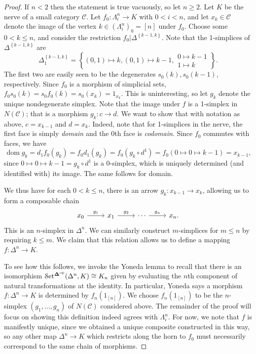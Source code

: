 \begin{proof}
	If $n<2$ then the statement is true vacuously, so let $n\geq 2$. Let $K$ be the nerve of a small category $\mathcal{C} $. Let $f_0 : \Lambda_i^n \to K$ with $0<i<n$, and let $x_k\in\mathcal{C} $ denote the image of the vertex $k\in\left( \Lambda_i^n \right) _0=[n]$ under $f_0$. Choose some $0<k\leq n$, and consider the restriction $f_0|\Delta^{\left\{ k-1,k \right\} } $. Note that the 1-simplices of $\Delta^{\left\{ k-1,k \right\} } $ are
	\[
		\Delta_1^{\left\{ k-1,k \right\} } =\left\{ (0,1)\mapsto k,(0,1)\mapsto k-1,
			\begin{matrix}
				0\mapsto k-1\\
				1\mapsto k
			\end{matrix}
		\right\} 
	.\]
	The first two are easily seen to be the degenerates $s_0(k),s_0(k-1)$, respectively. Since $f_0$ is a morphism of simplicial sets, $f_0s_0(k)=s_0f_0(k)=s_0(x_k)=1_{x_k} $. This is uninteresting, so let $g_k$ denote the unique nondegenerate simplex. Note that the image under $f$ is a 1-simplex in $N(\mathcal{C} )$; that is a morphism $g_k : c \to d$. We want to show that with notation as above, $c=x_{k-1} $ and $d=x_k$. Indeed, note that for 1-simplices in the nerve, the first face is simply \emph{domain} and the 0th face is \emph{codomain}. Since $f_0$ commutes with faces, we have
	\[
		\operatorname{dom} g_k=d_1f_0(g_k)=f_0d_1(g_k)=f_0(g_k\circ d^1)=f_0(0\mapsto 0\mapsto k-1)=x_{k-1} ,
	\]
	since $0\mapsto 0\mapsto k-1=g_k\circ d^1$ is a 0-simplex, which is uniquely determined (and identified with) its image. The same follows for domain.
	
	We thus have for each $0<k\leq n$, there is an arrow $g_k : x_{k-1}  \to x_k$, allowing us to form a composable chain
	\[\begin{tikzcd}[row sep = 2.5em, column sep = 2.5em]
	x_0 \ar[" g_1 ", r]  & x_1 \ar[" g_2 ", r]  & \cdots \ar[" g_n ", r] & x_n.
	\end{tikzcd}\]
	This is an $n$-simplex in $\Delta^n$. We can similarly construct $m$-simplices for $m\leq n$ by requiring $k\leq m$. We claim that this relation allows us to define a mapping $f : \Delta^n \to K$.

	To see how this follows, we invoke the Yoneda lemma to recall that there is an isomorphism $\mathcal{S}\mathrm{et} ^{\boldsymbol{\Delta} ^{\mathrm{op}} } (\Delta^n,K)\cong K_n$ given by evaluating the $n$th component of natural transformations at the identity. In particular, Yoneda says a morphism $f : \Delta^n \to K$ is determined by $f_n(1_{[n]} )$. We choose $f_n(1_{[n]} )$ to be the $n$-simplex $(g_1, \ldots ,g_n)$ of $N(\mathcal{C} )$ considered above. The remainder of the proof will focus on showing this definition indeed agrees with $\Lambda_i^n$. For now, we note that $f$ is manifestly unique, since we obtained a unique composite constructed in this way, so any other map $\Delta^n \to K$ which restricts along the horn to $f_0$ must necessarily correspond to the same chain of morphisms.


\end{proof}
